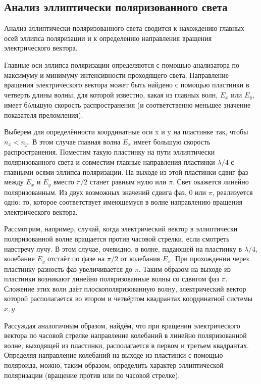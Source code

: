 \documentclass[12pt,a4paper]{scrartcl}
\begin{document}
	\subsection{Анализ эллиптически поляризованного света}
	
	Анализ эллиптически поляризованного света сводится к нахождению главных осей эллипса поляризации и к определению направления вращения электрического вектора.
	
	Главные оси эллипса поляризации определяются с помощью анализатора по максимуму и минимуму интенсивности проходящего света.
	Направление вращения электрического вектора может быть найдено
	с помощью пластинки в четверть длины волны, для которой известно,
	какая из главных волн, $ E_x $ или $ E_y $, имеет б\'{o}льшую скорость распространения (и соответственно меньшее значение показателя преломления).
	
	Выберем для определённости координатные оси x и y на пластинке
	так, чтобы $ n_x < n_y $. В этом случае главная волна $ E_x $ имеет большую
	скорость распространения. Поместим такую пластинку на пути эллиптически поляризованного света и совместим главные направления пластинки $ \lambda/4 $ с главными осями эллипса поляризации. На выходе из этой пластинки сдвиг фаз между $ E_x $ и $ E_y $ вместо $ \pi/2 $ станет равным нулю или $ \pi $. Свет окажется линейно поляризованным. Из двух возможных значений сдвига фаз, 0 или $ \pi $, реализуется одно: то, которое соответствует имеющемуся в волне направлению вращения электрического вектора.
	
	Рассмотрим, например, случай, когда электрический вектор в эллиптически поляризованной волне вращается против часовой стрелки,
	если смотреть навстречу лучу. В этом случае, очевидно, в волне, падающей на пластинку в $ \lambda/4 $, колебание $ E_y $ отстаёт по фазе на $ \pi/2 $ от
	колебания $ E_x $. При прохождении через пластинку разность фаз увеличивается до $ \pi $. Таким образом на выходе из пластинки возникают линейно поляризованные волны со сдвигом фаз $ \pi $. Сложение этих волн
	даёт плоскополяризованную волну, электрический вектор которой располагается во втором и четвёртом квадрантах координатной системы	$ x, y $.
	
	Рассуждая аналогичным образом, найдём, что при вращении электрического вектора по часовой стрелке направление колебаний в линейно поляризованной волне, выходящей из пластинки, располагается в первом и третьем квадрантах. Определяя направление колебаний на выходе из пластинки с помощью поляроида, можно, таким образом, определить характер эллиптической поляризации (вращение против или по часовой стрелке).
	
\end{document}
